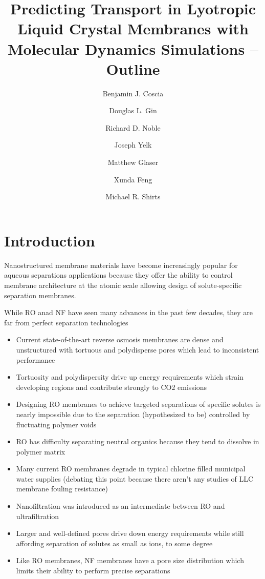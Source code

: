 \documentclass{article}
\title{Predicting Transport in Lyotropic Liquid Crystal Membranes with Molecular Dynamics Simulations -- Outline}
\author{Benjamin J. Coscia \and Douglas L. Gin \and Richard D. Noble \and Joseph Yelk \and Matthew Glaser \and Xunda Feng \and Michael R. Shirts}
\begin{document}
	
	\graphicspath{{./figures/}}
	\maketitle
	\section{Introduction}
	Nanostructured membrane materials have become increasingly popular for aqueous separations applications because they offer the ability to control membrane architecture at the atomic scale allowing design of solute-specific separation membranes.
	
	While RO anad NF have seen many advances in the past few decades, they are far from perfect separation technologies
	\begin{itemize}
		\item Current state-of-the-art reverse osmosis membranes are dense and unstructured with tortuous and polydisperse pores which lead to 
inconsistent performance
		\item Tortuosity and polydispersity drive up energy requirements which 
strain developing regions and contribute strongly to CO2 emissions
		\item Designing RO membranes to achieve targeted separations of specific solutes is nearly impossible due to the separation (hypothesized to be) controlled by fluctuating polymer voids
		\item RO has difficulty separating neutral organics because they tend to dissolve in polymer matrix
		\item Many current RO membranes degrade in typical chlorine filled municipal water supplies (debating this point because there aren't any studies of LLC membrane fouling resistance)
		\item Nanofiltration was introduced as an intermediate between RO and ultrafiltration
		\item Larger and well-defined pores drive down energy requirements while still affording separation of solutes as small as ions, to some degree
		\item Like RO membranes, NF membranes have a pore size distribution which limits their ability to perform precise separations
	\end{itemize}	
\end{document}
